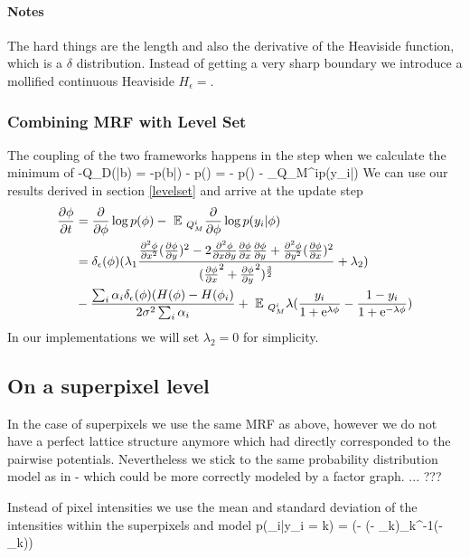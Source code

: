 \documentclass{article} %
\begin{document}
\paragraph{Notes}
The hard things are the length and also the derivative of the Heaviside function, which is a $\delta$ distribution. Instead of getting a very sharp boundary we introduce a mollified continuous Heaviside $H_{\epsilon} = $.

\subsubsection{Combining MRF with Level Set}
The coupling of the two frameworks happens in the step when we calculate the minimum of
\beqs
-\log Q_D(\phi|b) = -\log p(b|\phi) - \log p(\phi) = - \log p(\phi) - \EE_{Q_M^i}\log p(y_i|\phi)
\eeqs
We can use our results derived in section \ref{levelset} and arrive at the update step
\begin{align*}
\frac{\partial \phi}{\partial t} &= \frac{\partial}{\partial \phi} \log p(\phi) -\mbox{ }\mathbb{E}\mbox{ }_{Q_M^i} \frac{\partial}{\partial \phi} \log p(y_i|\phi)\\
&= \delta_{\epsilon}(\phi)(\lambda_1  \frac{ \frac{\partial^2 \phi}{\partial x^2} (\frac{\partial \phi}{\partial y})^2 - 2 \frac{\partial^2 \phi}{\partial x \partial y} \frac{\partial \phi}{\partial x}\frac{\partial \phi}{\partial y} +  \frac{\partial^2 \phi}{\partial y^2} (\frac{\partial \phi}{\partial x})^2}{(\frac{\partial \phi}{\partial x}^2  + \frac{\partial \phi}{\partial y}^2)^{\frac{3}{2}}} + \lambda_2) \\
&- \frac{\sum_i \alpha_i  \delta_{\epsilon}(\phi)(H(\phi)-H(\phi_i)}{2\sigma^2 \sum_i \alpha_i} + \mbox{ }\mathbb{E}\mbox{ }_{Q_M^i} \lambda(\frac{y_i}{1 +\mathrm{e}^{\lambda \phi}} - \frac{1-y_i}{1 + \mathrm{e}^{-\lambda \phi}})
\nonumber
\end{align*}
In our implementations we will set $\lambda_2 =0$ for simplicity.


\subsection{On a superpixel level}
In the case of superpixels we use the same MRF as above, however we do not have a perfect lattice structure anymore which had directly corresponded to the pairwise potentials. Nevertheless we stick to the same probability distribution model as in - which could be more correctly modeled by a factor graph. ... ???

Instead of pixel intensities we use the mean and standard deviation of the intensities within the superpixels and model 
\beqs
p(\bx_i|y_i = k) =  \exp(- (\bx- \mathbf{\mu}_k)\Sigma_k^{-1}(\bx - \mathbf{\mu}_k))
\eeqs
\end{document}
